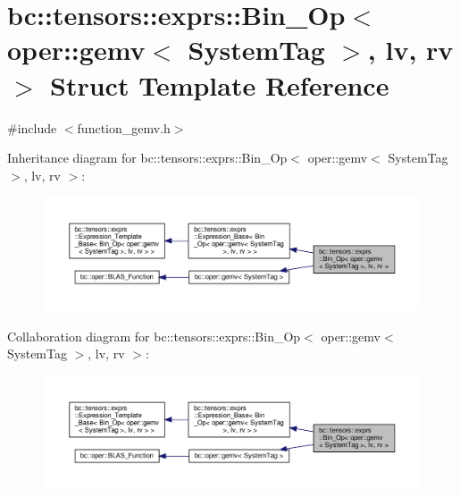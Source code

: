\hypertarget{structbc_1_1tensors_1_1exprs_1_1Bin__Op_3_01oper_1_1gemv_3_01SystemTag_01_4_00_01lv_00_01rv_01_4}{}\section{bc\+:\+:tensors\+:\+:exprs\+:\+:Bin\+\_\+\+Op$<$ oper\+:\+:gemv$<$ System\+Tag $>$, lv, rv $>$ Struct Template Reference}
\label{structbc_1_1tensors_1_1exprs_1_1Bin__Op_3_01oper_1_1gemv_3_01SystemTag_01_4_00_01lv_00_01rv_01_4}


{\ttfamily \#include $<$function\+\_\+gemv.\+h$>$}



Inheritance diagram for bc\+:\+:tensors\+:\+:exprs\+:\+:Bin\+\_\+\+Op$<$ oper\+:\+:gemv$<$ System\+Tag $>$, lv, rv $>$\+:\nopagebreak
\begin{figure}[H]
\begin{center}
\leavevmode
\includegraphics[width=350pt]{structbc_1_1tensors_1_1exprs_1_1Bin__Op_3_01oper_1_1gemv_3_01SystemTag_01_4_00_01lv_00_01rv_01_4__inherit__graph}
\end{center}
\end{figure}


Collaboration diagram for bc\+:\+:tensors\+:\+:exprs\+:\+:Bin\+\_\+\+Op$<$ oper\+:\+:gemv$<$ System\+Tag $>$, lv, rv $>$\+:\nopagebreak
\begin{figure}[H]
\begin{center}
\leavevmode
\includegraphics[width=350pt]{structbc_1_1tensors_1_1exprs_1_1Bin__Op_3_01oper_1_1gemv_3_01SystemTag_01_4_00_01lv_00_01rv_01_4__coll__graph}
\end{center}
\end{figure}
